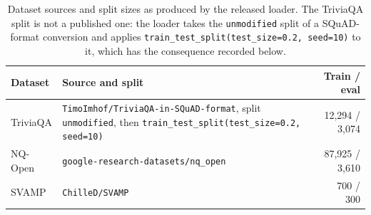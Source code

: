 \begin{table}[htb]
\centering
\small
\caption{Dataset sources and split sizes as produced by the released loader.
  The TriviaQA split is not a published one: the loader takes the
  \texttt{unmodified} split of a SQuAD-format conversion and applies
  \texttt{train\_test\_split(test\_size=0.2, seed=10)} to it, which has the
  consequence recorded below.}
\label{tab:dataset-sources}
\begingroup
\setlength{\tabcolsep}{4pt}
\begin{tabular}{@{}p{1.5cm}>{\raggedright\arraybackslash}p{5.9cm}r@{}}
\toprule
Dataset & Source and split & Train / eval \\
\midrule
TriviaQA & \texttt{TimoImhof/TriviaQA-in-SQuAD-format}, split
  \texttt{unmodified}, then \texttt{train\_test\_split(test\_size=0.2,
  seed=10)} & 12{,}294 / 3{,}074 \\
NQ-Open & \texttt{google-research-datasets/nq\_open} & 87{,}925 / 3{,}610 \\
SVAMP & \texttt{ChilleD/SVAMP} & 700 / 300 \\
\bottomrule
\end{tabular}
\endgroup
\end{table}

